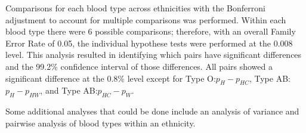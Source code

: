 \documentclass{article}\usepackage[]{graphicx}\usepackage[]{color}
\begin{document}
Comparisons for each blood type across ethnicities with the Bonferroni adjustment to account for multiple comparisons was performed.  Within each blood type there were 6 possible comparisons; therefore, with an overall Family Error Rate of 0.05, the individual hypothese tests were performed at the 0.008 level.  This analysis resulted in identifying which
pairs have significant differences and the 99.2\% confidence interval of those differences.  All pairs showed a significant difference at the 0.8\% level except for Type O:$p_H - p_{HC}$, Type AB:$p_H - p_{HW}$, and Type AB:$p_{HC} - p_W$.

Some additional analyses that could be done include an analysis of variance and pairwise analysis of blood types within an ethnicity.
\end{document}
